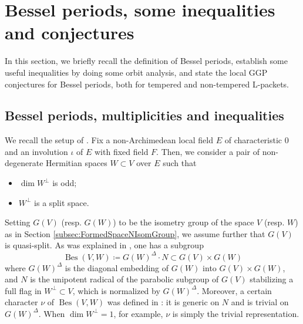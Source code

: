 \documentclass[11pt,letterpaper]{amsart}
\theoremstyle{plain}
\numberwithin{theorem}{section}
\numberwithin{equation}{subsection}
\theoremstyle{remark}
\newcommand{\Bes}{\operatorname{Bes}} %
\begin{document}
\section{Bessel periods, some inequalities and conjectures} %
\label{sec:bessel_periods_conjectures_and_some_inequalities}

In this section, we briefly recall the definition of Bessel periods, establish some useful inequalities by doing some orbit analysis, and state the local GGP conjectures for Bessel periods, both for tempered and non-tempered L-packets. 

\subsection{Bessel periods, multiplicities and inequalities} %
\label{sub:bessel_subgroups_and_bessel_periods}

We recall the setup of \cite[Sect. 12]{MR3202556}. Fix a non-Archimedean local field $E$ of characteristic $0$ and an involution $\iota$ of $E$ with fixed field $F$. Then, we consider a pair of non-degenerate Hermitian spaces $W \subset V$ over $E$ such that
\vskip 5pt
\begin{itemize}
    \item $\dim W^{\perp}$ is odd;

    \vskip 5pt

    \item $W^{\perp}$ is a split space.
\end{itemize}
\vskip 5pt
Setting $G\left(V\right)$ (resp. $G\left(W\right)$) to be the isometry group of the space $V$ (resp. $W$) as in Section \ref{subsec:FormedSpaceNIsomGroup}, we assume further that $G\left(V\right)$ is quasi-split. As was explained in \cite[Sect. 2]{MR3202556}, one has a subgroup 
\[
    \Bes\left(V,W\right) \coloneqq G\left(W\right)^{\Delta} \cdot N \subset G\left(V\right) \times G\left(W\right)
\]
where $G\left(W\right)^{\Delta}$ is the diagonal embedding of $G\left(W\right)$ into $G\left(V\right)\times G\left(W\right)$, and $N$ is the unipotent radical of the parabolic subgroup of $G\left(V\right)$ stabilizing a full flag in $W^\perp\subset V$, which is normalized by $G\left(W\right)^{\Delta}$. Moreover, a certain character $\nu$ of $\Bes\left(V,W\right)$ was defined in \cite[Sect. 12]{MR3202556}: it is generic on $N$ and is trivial on $G\left(W\right)^\Delta$. When $\dim W^{\perp} = 1$, for example, $\nu$ is simply the trivial representation. 

\vskip 5pt
\end{document}
